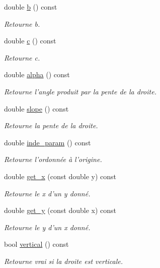 \begin{DoxyCompactItemize}
double \hyperlink{classLine_a3fbf3dbd1b40db13b2624d69ab5cca27}{b} () const 
\begin{DoxyCompactList}\small\item\em Retourne b. \end{DoxyCompactList}\item 
double \hyperlink{classLine_a178f0e9f733556ef03ba94e5aac96005}{c} () const 
\begin{DoxyCompactList}\small\item\em Retourne c. \end{DoxyCompactList}\item 
double \hyperlink{classLine_afe0a0abb45c0adccaedfaded8645600f}{alpha} () const 
\begin{DoxyCompactList}\small\item\em Retourne l'angle produit par la pente de la droite. \end{DoxyCompactList}\item 
double \hyperlink{classLine_a582597e85fc78ba06ccdddf6c270ed71}{slope} () const 
\begin{DoxyCompactList}\small\item\em Retourne la pente de la droite. \end{DoxyCompactList}\item 
double \hyperlink{classLine_a786bca726aa14177ebedbfeddc4bb8e5}{inde\+\_\+param} () const 
\begin{DoxyCompactList}\small\item\em Retourne l'ordonnée à l'origine. \end{DoxyCompactList}\item 
double \hyperlink{classLine_a53605544b400dda2164802a374f25b92}{get\+\_\+x} (const double y) const 
\begin{DoxyCompactList}\small\item\em Retourne le x d'un y donné. \end{DoxyCompactList}\item 
double \hyperlink{classLine_abe48fc1d77385ea5a80dc0a314127cff}{get\+\_\+y} (const double x) const 
\begin{DoxyCompactList}\small\item\em Retourne le y d'un x donné. \end{DoxyCompactList}\item 
bool \hyperlink{classLine_a8774606646298fb27a6e158af5e84590}{vertical} () const 
\begin{DoxyCompactList}\small\item\em Retourne vrai si la droite est verticale. \end{DoxyCompactList}\item 

\end{DoxyCompactItemize}
